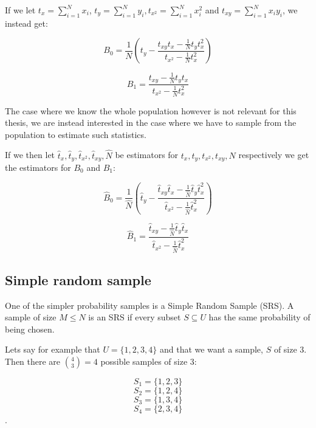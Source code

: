 \documentclass{article}
\begin{document}
If we let $t_x = \sum_{i = 1}^N x_i$, $t_y = \sum_{i = 1}^N y_i, t_{x^2} =
\sum_{i = 1}^N x_i^2$ and $t_{xy} =
\sum_{i = 1}^N x_i y_i$, we instead get:

\begin{equation*}
  B_0 = \frac{1}{N} \left( t_y - \frac{t_{xy} t_x - \frac{1}{N} t_y t_x^2}
    {t_{x^2} - \frac{1}{N} t_x^2}
   \right)
\end{equation*}

\begin{equation*}
  B_1 = \frac{t_{xy} - \frac{1}{N} t_y t_x}
    {t_{x^2} - \frac{1}{N} t_x^2}
\end{equation*}

The case where we know the whole population however is not relevant for this
thesis, we are instead interested in the case where we have to sample from the
population to estimate such statistics.

If we then let $\hat{t}_x, \hat{t}_y, \hat{t}_{x^2}, \hat{t}_{xy}, \hat{N}$ be estimators
for $t_x, t_y, t_{x^2},
t_{xy}, N$ respectively we get the estimators for $B_0$ and $B_1$:

\begin{equation*}
  \hat{B}_0 = \frac{1}{\widehat{N}} \left( \hat{t}_y - \frac{\hat{t}_{xy} \hat{t}_x - \frac{1}{\widehat{N}} \hat{t}_y \hat{t}_x^2}
    {\hat{t}_{x^2} - \frac{1}{\widehat{N}} \hat{t}_x^2}
    \right)
\end{equation*}

\begin{equation*}
  \hat{B}_1 = \frac{\hat{t}_{xy} - \frac{1}{\widehat{N}} \hat{t}_y \hat{t}_x}
    {\hat{t}_{x^2} - \frac{1}{\widehat{N}} \hat{t}_x^2}
\end{equation*}

\subsection{Simple random sample}

One of the simpler probability samples is a Simple Random Sample (SRS). A
sample of size $M \leq N$ is an SRS if every subset $S \subseteq U$ has the same
probability of being chosen.

Lets say for example that $U = \{1, 2, 3, 4\}$ and that we want a sample, $S$ of
size $3$. Then there are $\binom{4}{3} = 4$  possible samples of size $3$:

\begin{equation*} S_1 = \{1, 2, 3\} \end{equation*}
\begin{equation*} S_2 = \{1, 2, 4\} \end{equation*}
\begin{equation*} S_3 = \{1, 3, 4\} \end{equation*}
\begin{equation*} S_4 = \{2, 3, 4\} \end{equation*}.
\end{document}
